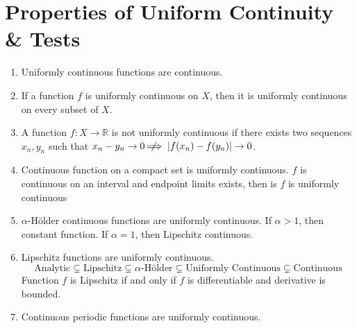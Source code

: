 \section{Properties of Uniform Continuity \& Tests}
\begin{enumerate}
	\item Uniformly continuous functions are continuous.
	\item If a function $f$ is uniformly continuous on $X$, then it is uniformly continuous on every subset of $X$.
	\item A function $f : X \to \mathbb{R}$ is not uniformly continuous if there exists two sequences $x_n,y_n$ such that $x_n-y_n \to 0 \;\not\nobreak\!\!\!\!\implies |f(x_n)-f(y_n)| \to 0$.
	\item Continuous function on a compact set is uniformly continuous.
		\subitem $f$ is continuous on an interval and endpoint limits exists, then is $f$ is uniformly continuous
	\item $\alpha$-H\"older continuous functions are uniformly continuous. 
	\subitem If $\alpha > 1$, then constant function. 
	\subitem If $\alpha = 1$, then Lipschitz continuous.
	\item Lipschitz functions are uniformly continuous.
	$$\text{Analytic} \subsetneq \text{Lipschitz} \subsetneq\text{$\alpha$-H\"older} \subsetneq \text{Uniformly Continuous} \subsetneq \text{Continuous}$$
	\subitem Function $f$ is Lipschitz if and only if $f$ is differentiable and derivative is bounded.
	\item Continuous periodic functions are uniformly continuous.
\end{enumerate}

